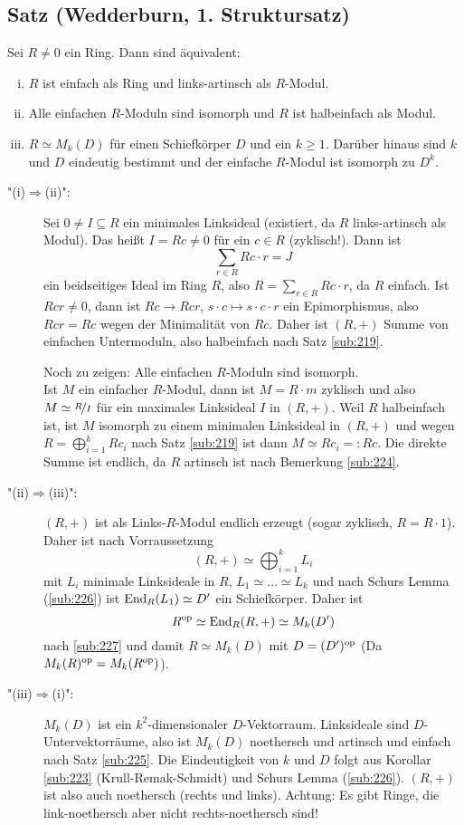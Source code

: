 \subsection{Satz (Wedderburn, 1. Struktursatz)} %
\label{sub:229}
Sei $R \not= 0$ ein Ring. Dann sind äquivalent:
\begin{enumerate}[(i)]
	\item $R$ ist einfach als Ring und links-artinsch als $R$-Modul.
	\item Alle einfachen $R$-Moduln sind isomorph und $R$ ist halbeinfach als Modul. 
	\item $R \simeq M_k(D)$ für einen Schiefkörper $D$ und ein $k\ge 1$. 
	Darüber hinaus sind $k$ und $D$ eindeutig bestimmt und der einfache $R$-Modul ist isomorph zu $D^k$.
\end{enumerate}
\begin{description}
	\item["(i)$\Rightarrow $(ii)":] Sei $0  \not= I \subseteq R$ ein minimales Linksideal (existiert, da $R$ links-artinsch als Modul). Das heißt $I = R c \not= 0$ für ein
	$c \in R$ (zyklisch!). Dann ist 
	\[
		\sum_{r \in R} R c \cdot r = J
	\] 
	ein beidseitiges Ideal im Ring $R$, also $R= \sum_{r\in R} Rc\cdot r$, da $R$ einfach. Ist $Rc r \not= 0$, dann ist $R c \to R c r$, $s\cdot c\mapsto s \cdot c\cdot r$
	ein Epimorphismus, also $R c r = R c$ wegen der Minimalität von $R c$. Daher ist $(R,+)$ Summe von einfachen Untermoduln, also halbeinfach nach Satz \ref{sub:219}.
	
	Noch zu zeigen: Alle einfachen $R$-Moduln sind isomorph. \\
	Ist $M$ ein einfacher $R$-Modul, dann ist $M = R \cdot m$ zyklisch und also $M \simeq \nicefrac{R}{I}$ für ein maximales Linksideal $I$ in $(R,+)$. Weil $R$ halbeinfach
	ist, ist $M$ isomorph zu einem minimalen Linksideal in $(R,+)$ und wegen $R = \bigoplus_{i=1}^k R c_i$ nach Satz \ref{sub:219} ist dann $M \simeq R c_i =: Rc$. Die 
	direkte Summe ist endlich, da $R$ artinsch ist nach Bemerkung \ref{sub:224}.
	\item["(ii)$\Rightarrow $(iii)":]  $(R,+)$ ist als Links-$R$-Modul endlich erzeugt (sogar zyklisch, $R= R \cdot 1$). Daher ist nach Vorraussetzung 
	\[
		(R,+) \simeq \bigoplus_{i=1}^k L_i
	\]
	mit $L_i$ minimale Linksideale in $R$, $L_1 \simeq \ldots  \simeq L_k$ und nach Schurs Lemma (\ref{sub:226}) ist $\operatorname{End}_R(L_1) \simeq D'$ ein Schiefkörper. Daher ist
	\[
		R^{\mathrm{op}} \simeq \operatorname{End}_R(R,+) \simeq M_k(D')
	\]
	nach \ref{sub:227} und damit $R \simeq M_k(D)$ mit $D= (D')^{\mathrm{op}}$ (Da $M_k(R)^{\mathrm{op}} = M_k(R^{\mathrm{op}})$).
	\item["(iii)$\Rightarrow$(i)":] $M_k(D)$ ist ein $k^2$-dimensionaler $D$-Vektorraum. Linksideale sind $D$-Untervektorräume, also ist $M_k(D)$ noethersch und artinsch 
	und einfach nach Satz \ref{sub:225}. Die Eindeutigkeit von $k$ und $D$ folgt aus Korollar \ref{sub:223} (Krull-Remak-Schmidt) und Schurs Lemma (\ref{sub:226}). 
	\bewende
	$(R,+)$ ist also auch noethersch (rechts und links). Achtung: Es gibt Ringe, die link-noethersch aber nicht rechts-noethersch sind!
\end{description}

